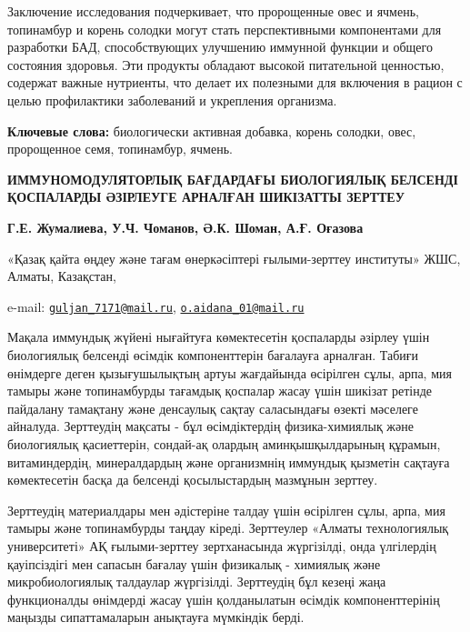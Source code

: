 Заключение исследования подчеркивает, что пророщенные овес и ячмень,
топинамбур и корень солодки могут стать перспективными компонентами для
разработки БАД, способствующих улучшению иммунной функции и общего
состояния здоровья. Эти продукты обладают высокой питательной ценностью,
содержат важные нутриенты, что делает их полезными для включения в
рацион с целью профилактики заболеваний и укрепления организма.

{\bfseries Ключевые слова:} биологически активная добавка, корень солодки,
овес, пророщенное семя, топинамбур, ячмень.

\begin{articleheader}
{\bfseries ИММУНОМОДУЛЯТОРЛЫҚ БАҒДАРДАҒЫ БИОЛОГИЯЛЫҚ БЕЛСЕНДІ ҚОСПАЛАРДЫ ӘЗІРЛЕУГЕ АРНАЛҒАН ШИКІЗАТТЫ ЗЕРТТЕУ}

{\bfseries
Г.Е. Жумалиева\textsuperscript{\envelope },
У.Ч. Чоманов,
Ә.К. Шоман,
А.Ғ. Оғазова\textsuperscript{\envelope }
}
\end{articleheader}

\begin{affiliation}
«Қазақ қайта өңдеу және тағам өнеркәсіптері ғылыми-зерттеу институты»
ЖШС, Алматы, Казақстан,

e-mail:
\href{mailto:guljan\_7171@mail.ru}{\nolinkurl{guljan\_7171@mail.ru}},
\href{mailto:o.aidana\_01@mail.ru}{\nolinkurl{o.aidana\_01@mail.ru}}
\end{affiliation}

Мақала иммундық жүйені нығайтуға көмектесетін қоспаларды әзірлеу үшін
биологиялық белсенді өсімдік компоненттерін бағалауға арналған. Табиғи
өнімдерге деген қызығушылықтың артуы жағдайында өсірілген сұлы, арпа,
мия тамыры және топинамбурды тағамдық қоспалар жасау үшін шикізат
ретінде пайдалану тамақтану және денсаулық сақтау саласындағы өзекті
мәселеге айналуда. Зерттеудің мақсаты - бұл өсімдіктердің
физика-химиялық және биологиялық қасиеттерін, сондай-ақ олардың
аминқышқылдарының құрамын, витаминдердің, минералдардың және организмнің
иммундық қызметін сақтауға көмектесетін басқа да белсенді қосылыстардың
мазмұнын зерттеу.

Зерттеудің материалдары мен әдістеріне талдау үшін өсірілген сұлы, арпа,
мия тамыры және топинамбурды таңдау кіреді. Зерттеулер «Алматы
технологиялық университеті» АҚ ғылыми-зерттеу зертханасында жүргізілді,
онда үлгілердің қауіпсіздігі мен сапасын бағалау үшін физикалық - химиялық
және микробиологиялық талдаулар жүргізілді. Зерттеудің бұл кезеңі жаңа
функционалды өнімдерді жасау үшін қолданылатын өсімдік компоненттерінің
маңызды сипаттамаларын анықтауға мүмкіндік берді.

